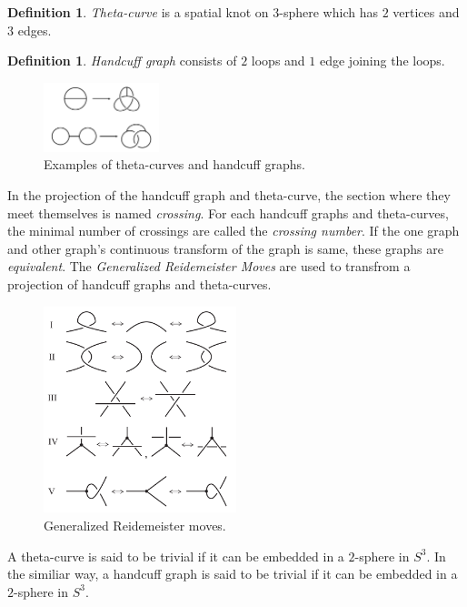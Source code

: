 \documentclass{article}
\theoremstyle{definition}
\newtheorem{defn}[thm]{Definition}
\theoremstyle{theorem}
\theoremstyle{proposition}
\theoremstyle{corollary}
\begin{document}
\begin{defn}
    \textit{Theta-curve} is a spatial knot on $3$-sphere which has $2$ vertices and $3$ edges. 
\end{defn}
\begin{defn}
    \textit{Handcuff graph} consists of $2$ loops and $1$ edge joining the loops.
\end{defn}

\begin{figure}[h]
    \centerline{\includegraphics[width=0.3\textwidth]{figure/theta and handcuff graph.png}}
    \caption{Examples of theta-curves and handcuff graphs.}
    \label{figure_1} 
\end{figure}

In the projection of the handcuff graph and theta-curve, the section where they meet themselves is named \textit{crossing}. 
For each handcuff graphs and theta-curves, the minimal number of crossings are called the \textit{crossing number}.
If the one graph and other graph's continuous transform of the graph is same, these graphs are \textit{equivalent}. 
The \textit{Generalized Reidemeister Moves} are used to transfrom a projection of handcuff graphs and theta-curves.\\

\begin{figure}[h]
    \centerline{\includegraphics[width=0.5\textwidth]{figure/reidemeister.png}}
    \caption{Generalized Reidemeister moves.}
    \label{figure_1} 
\end{figure}

A theta-curve is said to be trivial if it can be embedded in a $2$-sphere in $S^3$.
In the similiar way, a handcuff graph is said to be trivial if it can be embedded in a $2$-sphere in $S^3$.
\end{document}

